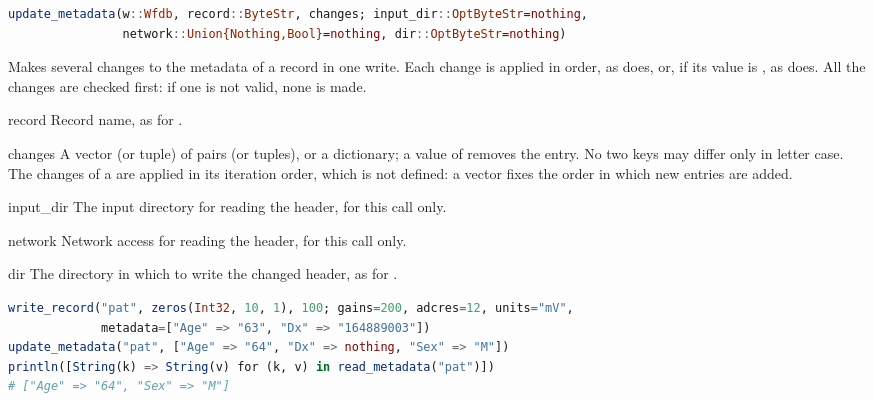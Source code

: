 \begin{lstlisting}[language=Julia,style=signature]
update_metadata(w::Wfdb, record::ByteStr, changes; input_dir::OptByteStr=nothing,
                network::Union{Nothing,Bool}=nothing, dir::OptByteStr=nothing)
\end{lstlisting}
Makes several changes to the metadata of a record in one write. Each change is applied in
order, as  does, or, if its value is , as
 does. All the changes are checked first: if one is not valid, none
is made.
\begin{params}
\item[record] Record name, as for .
\item[changes] A vector (or tuple) of  pairs (or 
  tuples), or a dictionary; a value of  removes the entry. No two keys may
  differ only in letter case. The changes of a  are applied in its iteration
  order, which is not defined: a vector fixes the order in which new entries are added.
\item[input\_dir] The input directory for reading the header, for this call only.
\item[network] Network access for reading the header, for this call only.
\item[dir] The directory in which to write the changed header, as for
  .
\end{params}
\begin{lstlisting}[language=Julia,style=example]
write_record("pat", zeros(Int32, 10, 1), 100; gains=200, adcres=12, units="mV",
             metadata=["Age" => "63", "Dx" => "164889003"])
update_metadata("pat", ["Age" => "64", "Dx" => nothing, "Sex" => "M"])
println([String(k) => String(v) for (k, v) in read_metadata("pat")])
# ["Age" => "64", "Sex" => "M"]
\end{lstlisting}

